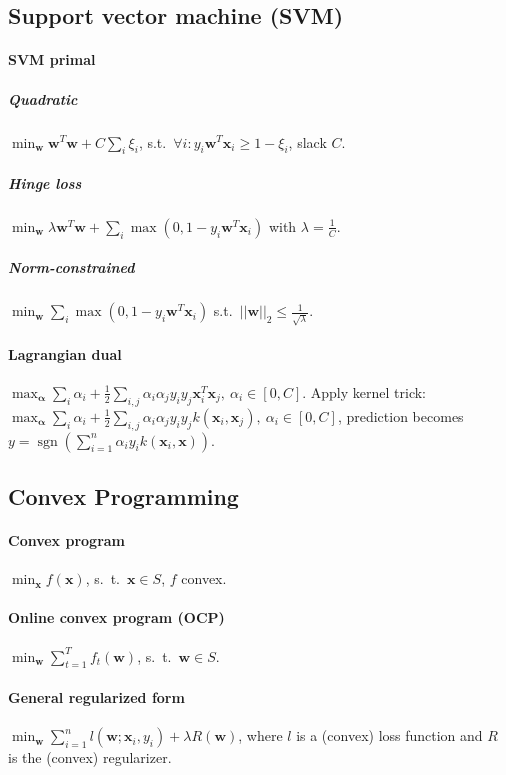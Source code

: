 \documentclass[9pt]{scrartcl}
\DeclareMathOperator{\sign}{sgn}
\begin{document}
\begin{twocolumn}
\subsection{Support vector machine (SVM)}
\paragraph{SVM primal}
\subparagraph{Quadratic} $\min_{\bm w} \bm w^T \bm w + C\sum_{i}\xi_i$,
s.t.\ $\forall i: y_i\bm w^T \bm x_i \geq 1 - \xi_i$, slack $C$.
\subparagraph{Hinge loss}
$\min_{\bm w} \lambda \bm w^T \bm w + \sum_{i}\max(0,1-y_i\bm w^T \bm x_i)$ with $\lambda = \frac{1}{C}$.
\subparagraph{Norm-constrained}
$\min_{\bm w} \sum_{i}\max(0,1-y_i\bm w^T\bm x_i)$ s.t.\ $||\bm w||_2 \leq \frac{1}{\sqrt \lambda}$.
\paragraph{Lagrangian dual}
$\max_{\bm \alpha} \sum_{i}\alpha_i + \frac{1}{2}\sum_{i,j}\alpha_i\alpha_j y_i y_j \bm x_i^T\bm x_j,\ \alpha_i \in [0,C]$.
Apply kernel trick: 
$\max_{\bm \alpha} \sum_{i}\alpha_i + \frac{1}{2}\sum_{i,j}\alpha_i\alpha_j y_i y_j k(\bm x_i, \bm x_j),\ \alpha_i \in [0,C]$, prediction becomes $y = \sign(\sum_{i=1}^{n}\alpha_i y_i k(\bm x_i,\bm x))$.

\subsection{Convex Programming}
\paragraph{Convex program} $\min_{\bm x} f(\bm x)$, s.\ t.\ $\bm x \in S$, $f$ convex.
\paragraph{Online convex program (OCP)} $\min_{\bm w} \sum_{t=1}^{T} f_t(\bm w)$, s.\ t.\ $\bm w \in S$.
\paragraph{General regularized form} $\min_{\bm w} \sum_{i=1}^{n} l(\bm w; \bm x_i, y_i) + \lambda R(\bm w)$, where $l$ is a (convex) loss function and $R$ is the (convex) regularizer.

\end{twocolumn}
\end{document}
